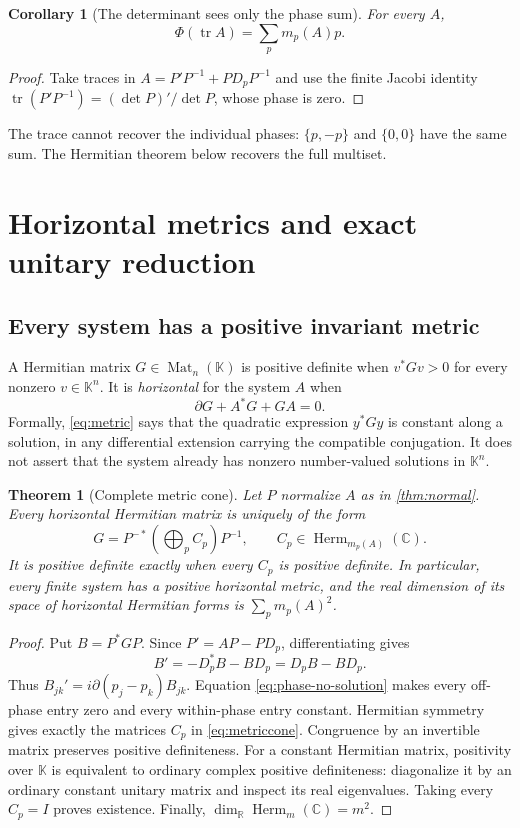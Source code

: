 \documentclass[11pt,a4paper]{article}
\numberwithin{equation}{section}
\newtheorem{theorem}{Theorem}[section]
\newtheorem{corollary}[corollary]{Corollary}
\theoremstyle{definition}
\theoremstyle{remark}
\newcommand{\K}{\mathbb K}
\newcommand{\R}{\mathbb R}
\newcommand{\C}{\mathbb C}
\newcommand{\tr}{\operatorname{tr}}
\newcommand{\Herm}{\operatorname{Herm}}
\newcommand{\Mat}{\operatorname{Mat}}
\begin{document}
\begin{corollary}[The determinant sees only the phase sum]\label{cor:trace}
For every $A$,
\[
 \Phi(\tr A)=\sum_p m_p(A)p.
\]
\end{corollary}
\begin{proof}
Take traces in $A=P'P^{-1}+PD_pP^{-1}$ and use the finite Jacobi identity
$\tr(P'P^{-1})=(\det P)'/\det P$, whose phase is zero.
\end{proof}
The trace cannot recover the individual phases: $\{p,-p\}$ and $\{0,0\}$
have the same sum. The Hermitian theorem below recovers the full multiset.

\section{Horizontal metrics and exact unitary reduction}\label{sec:metrics}

\subsection{Every system has a positive invariant metric}
A Hermitian matrix $G\in\Mat_n(\K)$ is positive definite when
$v^*Gv>0$ for every nonzero $v\in\K^n$. It is \emph{horizontal} for the
system $A$ when
\begin{equation}\label{eq:metric}
 \partial G+A^*G+GA=0.
\end{equation}
Formally, \eqref{eq:metric} says that the quadratic expression $y^*Gy$ is
constant along a solution, in any differential extension carrying the
compatible conjugation. It does not assert that the system already has
nonzero number-valued solutions in $\K^n$.

\begin{theorem}[Complete metric cone]\label{thm:metric}
Let $P$ normalize $A$ as in \cref{thm:normal}. Every horizontal Hermitian
matrix is uniquely of the form
\begin{equation}\label{eq:metriccone}
 G=P^{-*}\left(\bigoplus_p C_p\right)P^{-1},
 \qquad C_p\in\Herm_{m_p(A)}(\C).
\end{equation}
It is positive definite exactly when every $C_p$ is positive definite.
In particular, every finite system has a positive horizontal metric, and
the real dimension of its space of horizontal Hermitian forms is
$\sum_p m_p(A)^2$.
\end{theorem}
\begin{proof}
Put $B=P^*GP$. Since $P'=AP-PD_p$, differentiating gives
\[
 B'=-D_p^*B-BD_p=D_pB-BD_p.
\]
Thus $B_{jk}'=i\partial(p_j-p_k)B_{jk}$. Equation
\eqref{eq:phase-no-solution} makes every off-phase entry zero and every
within-phase entry constant. Hermitian symmetry gives exactly the matrices
$C_p$ in \eqref{eq:metriccone}. Congruence by an invertible matrix preserves
positive definiteness. For a constant Hermitian matrix, positivity over
$\K$ is equivalent to ordinary complex positive definiteness: diagonalize
it by an ordinary constant unitary matrix and inspect its real eigenvalues.
Taking every $C_p=I$ proves existence. Finally,
$\dim_{\R}\Herm_m(\C)=m^2$.
\end{proof}
\end{document}
